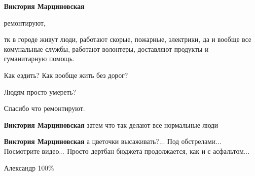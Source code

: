 \begin{multicols}{2}
\begin{itemize}
\textbf{Виктория Марциновская} 

ремонтируют,

тк в городе живут люди, работают скорые, пожарные, электрики, да и вообще все
комунальные службы, работают волонтеры, доставляют продукты и гуманитарную
помощь.

Как ездить? Как вообще жить без дорог?

Людям просто умереть?

Спасибо что ремонтируют.

\textbf{Виктория Марциновская} затем что так делают все нормальные люди

\textbf{Виктория Марциновская} а цветочки высаживать?... Под обстрелами... Посмотрите видео... Просто дертбан бюджета продолжается, как и с асфальтом...

Александр 100\%

\end{itemize} %

\end{multicols} %


